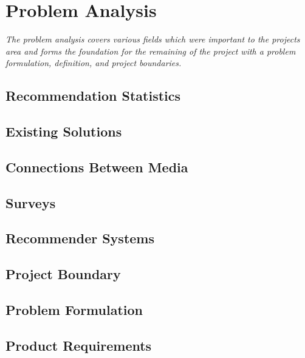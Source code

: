 \chapter{Problem Analysis}

\textit{The problem analysis covers various fields which were important to the projects area and forms the foundation for the remaining of the project with a problem formulation, definition, and project boundaries.}

\section{Recommendation Statistics}
\label{Statistics}

\section{Existing Solutions}
\label{Existing}

\section{Connections Between Media}
\label{Connections}

\section{Surveys}
\label{Surveys}

\section{Recommender Systems}
\label{RecommenderSystems}

\section{Project Boundary}
\label{Boundary}

\section{Problem Formulation}
\label{Formulation}

\section{Product Requirements}
\label{Requirements}
